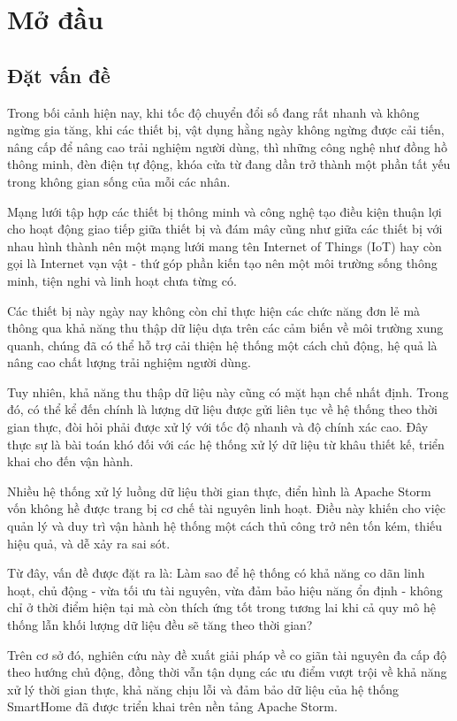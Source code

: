 \chapter{Mở đầu}

\section{Đặt vấn đề}

Trong bối cảnh hiện nay, khi tốc độ chuyển đổi số đang rất nhanh và không ngừng gia tăng, khi các thiết bị, vật dụng hằng ngày không ngừng được cải tiến, nâng cấp để nâng cao trải nghiệm người dùng, thì những công nghệ như đồng hồ thông minh, đèn điện tự động, khóa cửa từ đang dần trở thành một phần tất yếu trong không gian sống của mỗi các nhân.

Mạng lưới tập hợp các thiết bị thông minh và công nghệ tạo điều kiện thuận lợi cho hoạt động giao tiếp giữa thiết bị và đám mây cũng như giữa các thiết bị với nhau hình thành nên một mạng lưới mang tên Internet of Things (IoT) hay còn gọi là Internet vạn vật - thứ góp phần kiến tạo nên một môi trường sống thông minh, tiện nghi và linh hoạt chưa từng có.

Các thiết bị này ngày nay không còn chỉ thực hiện các chức năng đơn lẻ mà thông qua khả năng thu thập dữ liệu dựa trên các cảm biến về môi trường xung quanh, chúng đã có thể hỗ trợ cải thiện hệ thống một cách chủ động, hệ quả là nâng cao chất lượng trải nghiệm người dùng.


Tuy nhiên, khả năng thu thập dữ liệu này cũng có mặt hạn chế nhất định. Trong đó, có thể kể đến chính là lượng dữ liệu được gửi liên tục về hệ thống theo thời gian thực, đòi hỏi phải được xử lý với tốc độ nhanh và độ chính xác cao. Đây thực sự là bài toán khó đối với các hệ thống xử lý dữ liệu từ khâu thiết kế, triển khai cho đến vận hành.

Nhiều hệ thống xử lý luồng dữ liệu thời gian thực, điển hình là Apache Storm vốn không hề được trang bị cơ chế tài nguyên linh hoạt. Điều này khiến cho việc quản lý và duy trì vận hành hệ thống một cách thủ công trở nên tốn kém, thiếu hiệu quả, và dễ xảy ra sai sót.

Từ đây, vấn đề được đặt ra là: Làm sao để hệ thống có khả năng co dãn linh hoạt, chủ động - vừa tối ưu tài nguyên, vừa đảm bảo hiệu năng ổn định - không chỉ ở thời điểm hiện tại mà còn thích ứng tốt trong tương lai khi cả quy mô hệ thống lẫn khối lượng dữ liệu đều sẽ tăng theo thời gian?

Trên cơ sở đó, nghiên cứu này đề xuất giải pháp về co giãn tài nguyên đa cấp độ theo hướng chủ động, đồng thời vẫn tận dụng các ưu điểm vượt trội về khả năng xử lý thời gian thực, khả năng chịu lỗi và đảm bảo dữ liệu của hệ thống SmartHome đã được triển khai trên nền tảng Apache Storm.